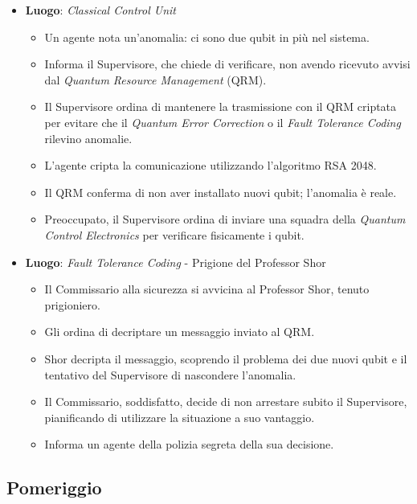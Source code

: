 \begin{itemize}
    \item \textbf{Luogo}: \emph{Classical Control Unit}
    \begin{itemize}
        \item Un agente nota un'anomalia: ci sono due qubit in più nel sistema.
        \item Informa il Supervisore, che chiede di verificare, non avendo ricevuto avvisi dal \emph{Quantum Resource Management} (QRM).
        \item Il Supervisore ordina di mantenere la trasmissione con il QRM criptata per evitare che il \emph{Quantum Error Correction} o il \emph{Fault Tolerance Coding} rilevino anomalie.
        \item L'agente cripta la comunicazione utilizzando l'algoritmo RSA 2048.
        \item Il QRM conferma di non aver installato nuovi qubit; l'anomalia è reale.
        \item Preoccupato, il Supervisore ordina di inviare una squadra della \emph{Quantum Control Electronics} per verificare fisicamente i qubit.
    \end{itemize}

    \item \textbf{Luogo}: \emph{Fault Tolerance Coding} - Prigione del Professor Shor
    \begin{itemize}
        \item Il Commissario alla sicurezza si avvicina al Professor Shor, tenuto prigioniero.
        \item Gli ordina di decriptare un messaggio inviato al QRM.
        \item Shor decripta il messaggio, scoprendo il problema dei due nuovi qubit e il tentativo del Supervisore di nascondere l'anomalia.
        \item Il Commissario, soddisfatto, decide di non arrestare subito il Supervisore, pianificando di utilizzare la situazione a suo vantaggio.
        \item Informa un agente della polizia segreta della sua decisione.
    \end{itemize}
\end{itemize}

\subsection*{Pomeriggio}


